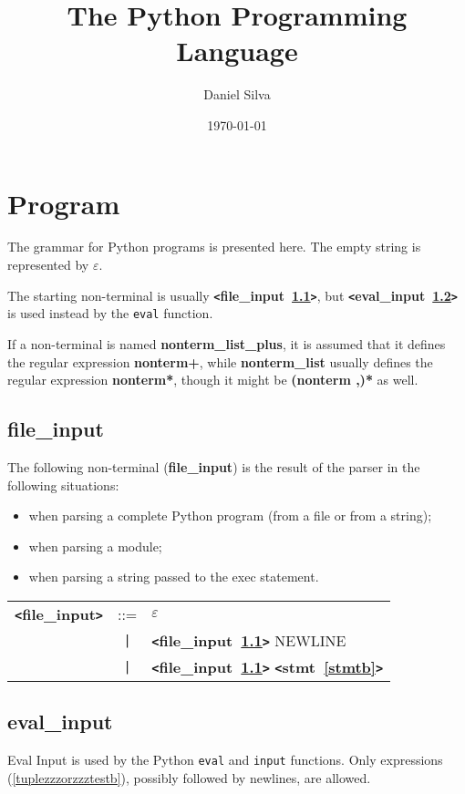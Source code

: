 \documentclass[12pt]{article}
\title{The Python Programming Language}
\author{Daniel Silva}
\date{\today}
\begin{document}
\maketitle
\tableofcontents
\newpage

\let\rulesection\subsection

\section{Program}

The grammar for Python programs is presented here.  The empty string is represented by $\varepsilon$.

The starting non-terminal is usually {\bf \verb+<+file\_input~\ref{filezzzinputb}\verb+>+}, but {\bf \verb+<+eval\_input~\ref{evalzzzinputb}\verb+>+} is used instead by the \verb|eval| function.

If a non-terminal is named {\bf nonterm\_list\_plus}, it is assumed that it defines the regular expression {\bf nonterm+}, while {\bf nonterm\_list} usually defines the regular expression {\bf nonterm*}, though it might be {\bf (nonterm ,)*} as well.

\rulesection{file\_input}
\label{filezzzinputb}
The following non-terminal ({\bf file\_{}input}) is the result of the parser in the following situations:
\begin{itemize}
\item when parsing a complete Python program (from a file or from a string);
\item when parsing a module;
\item when parsing a string passed to the exec statement.
\end{itemize}

\begin{tabular}{lcl}
{\bf \verb+<+file\_input\verb+>+} & ::=  & $\varepsilon$ \\
 & \verb+|+  & {\bf \verb+<+file\_input~\ref{filezzzinputb}\verb+>+}  NEWLINE \\
 & \verb+|+  & {\bf \verb+<+file\_input~\ref{filezzzinputb}\verb+>+}  {\bf \verb+<+stmt~\ref{stmtb}\verb+>+}  \\
\end{tabular}

\rulesection{eval\_input}
\label{evalzzzinputb}
Eval Input is used by the Python \verb+eval+ and \verb+input+ functions.  Only expressions (\ref{tuplezzzorzzztestb}), possibly followed by newlines, are allowed. \\
\end{document}
